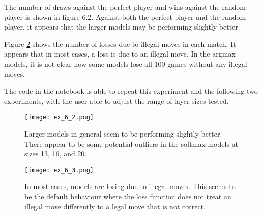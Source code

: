 \documentclass{somasmsc}
\begin{document}
\begin{exa}
The number of draws against the perfect player and wins against the random player is shown in figure 6.2. Against both the perfect player and the random player, it appears that the larger models may be performing slightly better.

 Figure \ref{ox:ex_6_3} shows the number of losses due to illegal moves in each match. It appears that in most cases, a loss is due to an illegal move. In the argmax models, it is not clear how some models lose all 100 games without any illegal moves.

The code in the notebook is able to repeat this experiment and the following two experiments, with the user able to adjust the range of layer sizes tested.

\begin{figure}[H]\label{ox:ex_6_2}
\begin{center}
\texttt{[image: ex\_6\_2.png]}
\end{center}
\caption{Larger models in general seem to be performing slightly better. There appear to be some potential outliers in the softmax models at sizes 13, 16, and 20.}
\end{figure}

\begin{figure}[H]\label{ox:ex_6_3}
\begin{center}
\texttt{[image: ex\_6\_3.png]}
\end{center}
\caption{In most cases, models are losing due to illegal moves. This seems to be the default behaviour where the loss function does not treat an illegal move differently to a legal move that is not correct.}
\end{figure}
\end{exa}
\end{document}
